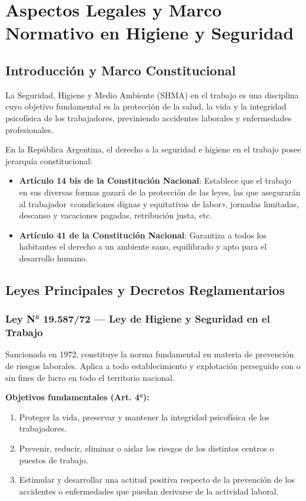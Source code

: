 \documentclass[]{informeutn}
\begin{document}
\tableofcontents
\setcounter{page}{1}
\thispagestyle{plain}

\chapter{Aspectos Legales y Marco Normativo en Higiene y Seguridad}

\section{Introducción y Marco Constitucional}
La Seguridad, Higiene y Medio Ambiente (SHMA) en el trabajo es una disciplina cuyo objetivo fundamental es la protección de la salud, la vida y la integridad psicofísica de los trabajadores, previniendo accidentes laborales y enfermedades profesionales.

En la República Argentina, el derecho a la seguridad e higiene en el trabajo posee jerarquía constitucional:
\begin{itemize}
    \item \textbf{Artículo 14 bis de la Constitución Nacional}: Establece que el trabajo en sus diversas formas gozará de la protección de las leyes, las que asegurarán al trabajador «condiciones dignas y equitativas de labor», jornadas limitadas, descanso y vacaciones pagadas, retribución justa, etc.
    \item \textbf{Artículo 41 de la Constitución Nacional}: Garantiza a todos los habitantes el derecho a un ambiente sano, equilibrado y apto para el desarrollo humano.
\end{itemize}

\section{Leyes Principales y Decretos Reglamentarios}

\subsection{Ley N° 19.587/72 — Ley de Higiene y Seguridad en el Trabajo}
Sancionada en 1972, constituye la norma fundamental en materia de prevención de riesgos laborales. Aplica a todo establecimiento y explotación perseguido con o sin fines de lucro en todo el territorio nacional.

\textbf{Objetivos fundamentales (Art. 4°):}
\begin{enumerate}
    \item Proteger la vida, preservar y mantener la integridad psicofísica de los trabajadores.
    \item Prevenir, reducir, eliminar o aislar los riesgos de los distintos centros o puestos de trabajo.
    \item Estimular y desarrollar una actitud positiva respecto de la prevención de los accidentes o enfermedades que puedan derivarse de la actividad laboral.
\end{enumerate}
\end{document}
